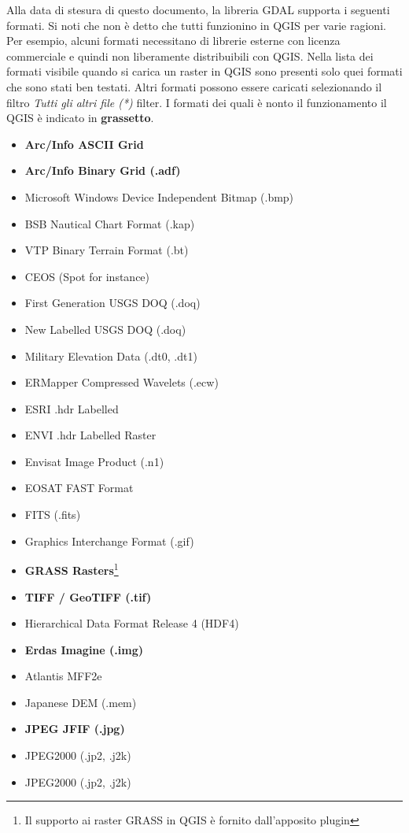 Alla data di stesura di questo documento, la libreria GDAL supporta i seguenti formati. Si noti che non è detto che tutti funzionino in QGIS per varie ragioni.
Per esempio, alcuni formati necessitano di librerie esterne con licenza commerciale e quindi non liberamente distribuibili con QGIS. Nella lista dei formati visibile quando si carica un raster in QGIS sono presenti solo quei formati che sono stati ben testati. Altri formati possono essere caricati selezionando il filtro \textsl{Tutti gli altri file (*)} filter. I formati dei quali è nonto il funzionamento il QGIS è indicato in \textbf{grassetto}.

\begin{itemize}
\item \textbf{Arc/Info ASCII Grid}
\item \textbf{Arc/Info Binary Grid (.adf)}
\item Microsoft Windows Device Independent Bitmap (.bmp)
\item BSB Nautical Chart Format (.kap)
\item VTP Binary Terrain Format (.bt)
\item CEOS (Spot for instance)
\item First Generation USGS DOQ (.doq)
\item New Labelled USGS DOQ (.doq)
\item Military Elevation Data (.dt0, .dt1)
\item ERMapper Compressed Wavelets (.ecw)
\item ESRI .hdr Labelled
\item ENVI .hdr Labelled Raster
\item Envisat Image Product (.n1)
\item EOSAT FAST Format
\item FITS (.fits)
\item Graphics Interchange Format (.gif)
\item \textbf{GRASS Rasters}\footnote{Il supporto ai raster GRASS in QGIS è fornito dall'apposito plugin} 
\item \textbf{TIFF / GeoTIFF (.tif)}
\item Hierarchical Data Format Release 4 (HDF4)
\item \textbf{Erdas Imagine (.img)}
\item Atlantis MFF2e
\item Japanese DEM (.mem)
\item \textbf{JPEG JFIF (.jpg)}
\item JPEG2000 (.jp2, .j2k)
\item JPEG2000 (.jp2, .j2k)

\end{itemize}
